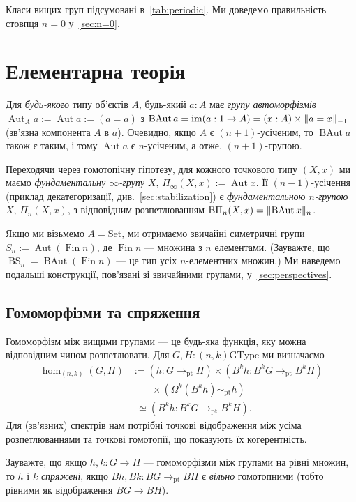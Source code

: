 \documentclass[12pt]{article}
\newcommand*{\Loop}{\Omega}
\newcommand*{\pt}{{\mathrm{pt}}}
\renewcommand*{\equiv}{\mathrel{\simeq}}
\DeclarePairedDelimiter\trunc{\lVert}{\rVert}
\DeclareMathOperator\Aut{Aut}
\DeclareMathOperator\BAut{BAut}
\newcommand*\BS{\mathop{BS}}
\newcommand*\Sym{S}
\DeclareMathOperator\im{im}
\DeclareMathOperator\Fin{Fin}
\newcommand*{\Set}{\mathrm{Set}}
\newcommand*{\GType}{\mathrm{GType}}
\begin{document}
Класи вищих груп підсумовані в~\autoref{tab:periodic}. Ми доведемо правильність стовпця $n=0$ у~\autoref{sec:n=0}.

\section{Елементарна теорія}
\label{sec:elementary-theory}

Для \emph{будь-якого} типу об'єктів $A$, будь-який $a : A$ має \emph{групу автоморфізмів} $\Aut_A a := \Aut a := (a = a)$ з $\BAut a = \im(a : 1 \to A) = (x : A) \times \trunc{a = x}_{-1}$ (зв'язна компонента $A$ в $a$). Очевидно, якщо $A$ є $(n+1)$-усіченим, то $\BAut a$ також є таким, і тому $\Aut a$ є $n$-усіченим, а отже, $(n+1)$-групою.

Переходячи через гомотопічну гіпотезу, для кожного точкового типу $(X,x)$ ми маємо \emph{фундаментальну $\infty$-групу $X$}, $\Pi_\infty(X,x) := \Aut x$. Її $(n-1)$-усічення (приклад декатегоризації, див.~\autoref{sec:stabilization}) є \emph{фундаментальною $n$-групою $X$}, $\Pi_n(X,x)$, з відповідним розпетлюванням $\mathrm{B}\Pi_n(X,x) = \trunc{\BAut x}_n$.

Якщо ми візьмемо $A = \Set$, ми отримаємо звичайні симетричні групи $\Sym_n := \Aut(\Fin n)$, де $\Fin n$ — множина з $n$ елементами. (Зауважте, що $\BS_n = \BAut(\Fin n)$ — це тип усіх $n$-елементних множин.) Ми наведемо подальші конструкції, пов'язані зі звичайними групами, у~\autoref{sec:perspectives}.

\subsection{Гомоморфізми та спряження}
\label{sec:homomorphisms}

Гомоморфізм між вищими групами — це будь-яка функція, яку можна відповідним чином розпетлювати. Для $G,H : (n,k)\GType$ ми визначаємо
\begin{align*}
\hom_{(n,k)}(G,H) & := 
(h: G \to_\pt H)\times (B^k h: B^kG \to_\pt B^kH) \\
& \qquad \times (\Loop^k(B^k h) \sim_\pt h) \\
&\phantom{:}\equiv (B^k h: B^kG \to_\pt B^kH).
\end{align*}
Для (зв'язних) спектрів нам потрібні точкові відображення між усіма розпетлюваннями та точкові гомотопії, що показують їх когерентність.

Зауважте, що якщо $h,k : G \to H$ — гомоморфізми між групами на рівні множин, то $h$ і $k$ \emph{спряжені}, якщо $Bh, Bk : BG \to_\pt BH$ є \emph{вільно} гомотопними (тобто рівними як відображення $BG \to BH$).
\end{document}

